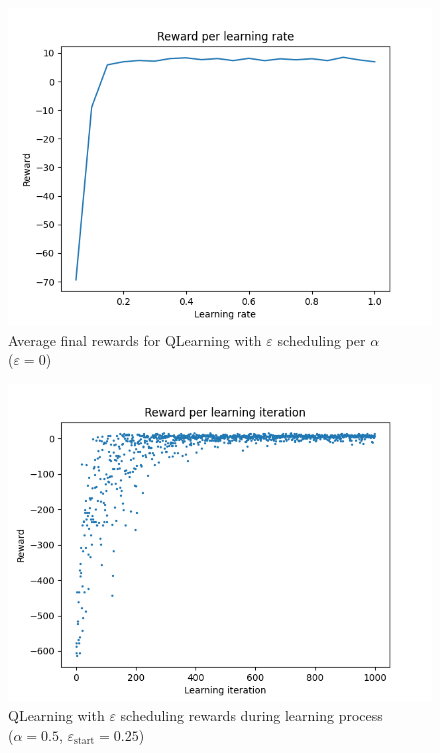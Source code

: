 \documentclass[11pt]{article}
\def\scheduleeps{0}
\begin{document}
\begin{figure}[H]
	\centering
	\includegraphics[width=12cm]{../figures/part_1/learning_reward_qlearning_alpha_search.png}
	\caption{Average final rewards for QLearning with $\varepsilon$ scheduling per $\alpha$\\($\varepsilon = \scheduleeps$)}
	\label{fig:qlearning_eps_schedule_alph_search}
\end{figure}

\begin{figure}[H]
	\centering
	\includegraphics[width=12cm]{../figures/part_2/learning_reward_base_qlearning_eps_schedule.png}
	\caption{QLearning with $\varepsilon$ scheduling rewards during learning process\\($\alpha = 0.5$, $\varepsilon_{\text{start}} = 0.25$)}
	\label{fig:qlearning_esp_schedule_base_reward}
\end{figure}
\end{document}
